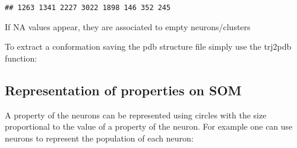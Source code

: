 \documentclass[
]{article}
\newenvironment{Shaded}{\begin{snugshade}}{\end{snugshade}}
\newcommand{\AttributeTok}[1]{\textcolor[rgb]{0.77,0.63,0.00}{#1}}
\newcommand{\CommentTok}[1]{\textcolor[rgb]{0.56,0.35,0.01}{\textit{#1}}}
\newcommand{\DecValTok}[1]{\textcolor[rgb]{0.00,0.00,0.81}{#1}}
\newcommand{\FunctionTok}[1]{\textcolor[rgb]{0.00,0.00,0.00}{#1}}
\newcommand{\NormalTok}[1]{#1}
\newcommand{\SpecialCharTok}[1]{\textcolor[rgb]{0.00,0.00,0.00}{#1}}
\newcommand{\StringTok}[1]{\textcolor[rgb]{0.31,0.60,0.02}{#1}}
\begin{document}
\begin{verbatim}
## 1263 1341 2227 3022 1898 146 352 245
\end{verbatim}

If NA values appear, they are associated to empty neurons/clusters

To extract a conformation saving the pdb structure file simply use the
trj2pdb function:

\begin{Shaded}
\end{Shaded}

\hypertarget{representation-of-properties-on-som}{%
\subsection{Representation of properties on
SOM}\label{representation-of-properties-on-som}}

A property of the neurons can be represented using circles with the size
proportional to the value of a property of the neuron. For example one
can use neurons to represent the population of each neuron:
\end{document}
